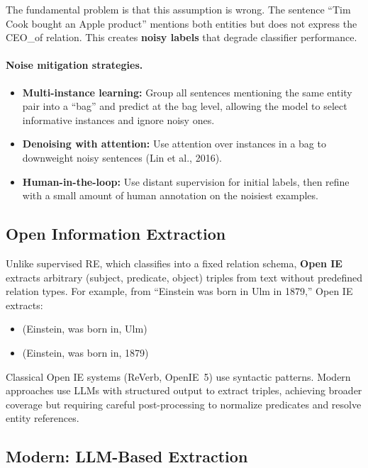The fundamental problem is that this assumption is wrong.  The sentence ``Tim Cook bought an
Apple product'' mentions both entities but does not express the CEO\_of relation.  This
creates \textbf{noisy labels} that degrade classifier performance.

\paragraph{Noise mitigation strategies.}
\begin{itemize}
    \item \textbf{Multi-instance learning:} Group all sentences mentioning the same entity
          pair into a ``bag'' and predict at the bag level, allowing the model to select
          informative instances and ignore noisy ones.
    \item \textbf{Denoising with attention:} Use attention over instances in a bag to
          downweight noisy sentences (Lin et al., 2016).
    \item \textbf{Human-in-the-loop:} Use distant supervision for initial labels, then
          refine with a small amount of human annotation on the noisiest examples.
\end{itemize}

\subsection{Open Information Extraction}

Unlike supervised RE, which classifies into a fixed relation schema, \textbf{Open IE} extracts
arbitrary (subject, predicate, object) triples from text without predefined relation types.
For example, from ``Einstein was born in Ulm in 1879,'' Open IE extracts:

\begin{itemize}
    \item (Einstein, was born in, Ulm)
    \item (Einstein, was born in, 1879)
\end{itemize}

Classical Open IE systems (ReVerb, OpenIE~5) use syntactic patterns.  Modern approaches use
LLMs with structured output to extract triples, achieving broader coverage but requiring
careful post-processing to normalize predicates and resolve entity references.

\subsection{Modern: LLM-Based Extraction}


